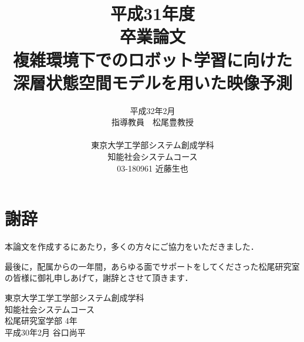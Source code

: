 \documentclass[a4paper,12pt,oneside,openany,dvipdfmx]{jsbook}
\title{
    平成31年度\\
    卒業論文\\
    複雑環境下でのロボット学習に向けた\\
    深層状態空間モデルを用いた映像予測
}
\author{
    平成32年2月\\
    指導教員　松尾豊教授\\
    \\
    東京大学工学部システム創成学科\\
    知能社会システムコース\\
    03-180961 近藤生也
}
\date{}
\begin{document}
\maketitle
\pagestyle{plain}
\setlength{\baselineskip}{22truept}
\frontmatter

\setcounter{tocdepth}{2}
\tableofcontents
\listoffigures
\listoftables
\mainmatter







\chapter*{謝辞}
本論文を作成するにあたり，多くの方々にご協力をいただきました．

最後に，配属からの一年間，あらゆる面でサポートをしてくださった松尾研究室の皆様に御礼申しあげて，謝辞とさせて頂きます．


\begin{flushright}
東京大学工学工学部システム創成学科\\
知能社会システムコース\\
松尾研究室学部 4年\\
平成30年2月 谷口尚平\\
\end{flushright}

\end{document}
